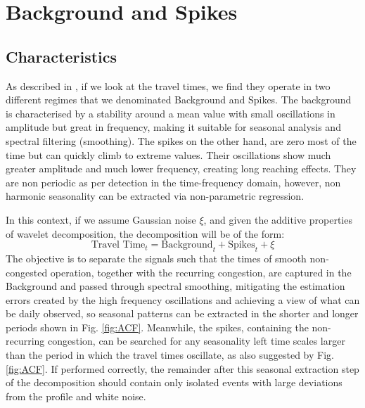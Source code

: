 \documentclass[a4paper, 10pt, conference]{ieeeconf}      %
\begin{document}
\section{Background and Spikes}
\subsection{Characteristics}
As described in \cite{ttprofiles}, if we look at the travel times, we find they operate in two different regimes that we denominated Background and Spikes.
The background is characterised by a stability around a mean value with small oscillations in amplitude but great in frequency, making it suitable for seasonal analysis and spectral filtering (smoothing).
The spikes on the other hand, are zero most of the time but can quickly climb to extreme values. Their oscillations show much greater amplitude and much lower frequency, creating long reaching effects. They are non periodic as per detection in the time-frequency domain, however, non harmonic seasonality can be extracted via non-parametric regression.

In this context, if we assume Gaussian noise $\xi$, and given the additive properties of wavelet decomposition, the decomposition will be of the form:
\begin{equation}
\textrm{Travel Time}_t  = \textrm{Background}_t + \textrm{Spikes}_t + \xi
\end{equation}
The objective is to separate the signals such that the times of smooth non-congested operation, together with the recurring congestion, are captured in the Background and passed through spectral smoothing, mitigating the estimation errors created by the high frequency oscillations and achieving a view of what can be daily observed, so seasonal patterns can be extracted in the shorter and longer periods shown in Fig. \ref{fig:ACF}.
Meanwhile, the spikes, containing the non-recurring congestion, can be searched for any seasonality left time scales larger than the period in which the travel times oscillate, as also suggested by Fig. \ref{fig:ACF}. 
If performed correctly, the remainder after this seasonal extraction step of the decomposition should contain only isolated events with large deviations from the profile and white noise.
\end{document}
